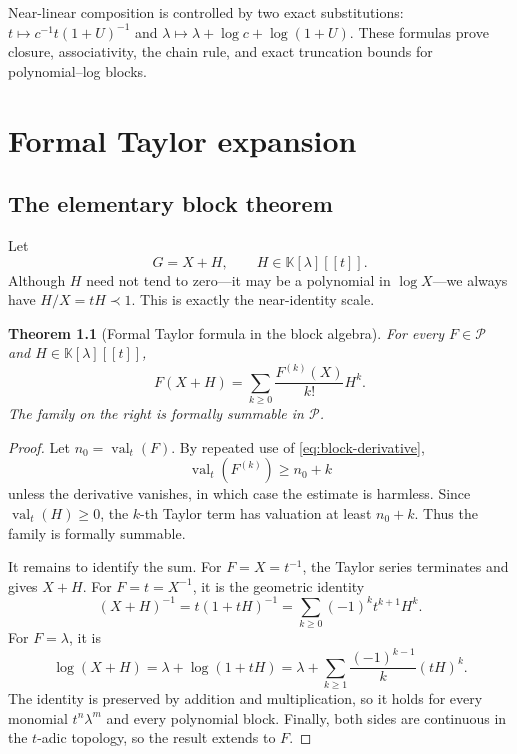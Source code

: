\documentclass[11pt,openany]{book}
\theoremstyle{definition}
\theoremstyle{plain}
\newtheorem{theorem}{Theorem}[chapter]
\theoremstyle{remark}
\newcommand{\K}{\mathbb{K}}
\newcommand{\Plog}{\mathscr{P}}
\newcommand{\precdom}{\prec}
\DeclareMathOperator{\val}{val}
\begin{document}
\begin{summarybox}
Near-linear composition is controlled by two exact substitutions: \(t\mapsto c^{-1}t(1+U)^{-1}\) and \(\lambda\mapsto\lambda+\log c+\log(1+U)\). These formulas prove closure, associativity, the chain rule, and exact truncation bounds for polynomial--log blocks.
\end{summarybox}

\chapter{Formal Taylor expansion}\label{ch:taylor}

\section{The elementary block theorem}
Let
\begin{equation}\label{eq:G-XH}
 G=X+H,
 \qquad H\in\K[\lambda][[t]].
\end{equation}
Although \(H\) need not tend to zero---it may be a polynomial in \(\log X\)---we always have \(H/X=tH\precdom1\). This is exactly the near-identity scale.

\begin{theorem}[Formal Taylor formula in the block algebra]\label{thm:block-taylor}
For every \(F\in\Plog\) and \(H\in\K[\lambda][[t]]\),
\begin{equation}\label{eq:block-taylor}
 F(X+H)=\sum_{k\ge0}\frac{F^{(k)}(X)}{k!}H^k.
\end{equation}
The family on the right is formally summable in \(\Plog\).
\end{theorem}

\begin{proof}
Let \(n_0=\val_t(F)\). By repeated use of \cref{eq:block-derivative},
\[
 \val_t(F^{(k)})\ge n_0+k
\]
unless the derivative vanishes, in which case the estimate is harmless. Since \(\val_t(H)\ge0\), the \(k\)-th Taylor term has valuation at least \(n_0+k\). Thus the family is formally summable.

It remains to identify the sum. For \(F=X=t^{-1}\), the Taylor series terminates and gives \(X+H\). For \(F=t=X^{-1}\), it is the geometric identity
\[
 (X+H)^{-1}=t(1+tH)^{-1}
 =\sum_{k\ge0}(-1)^kt^{k+1}H^k.
\]
For \(F=\lambda\), it is
\[
 \log(X+H)=\lambda+\log(1+tH)
 =\lambda+\sum_{k\ge1}\frac{(-1)^{k-1}}k(tH)^k.
\]
The identity is preserved by addition and multiplication, so it holds for every monomial \(t^n\lambda^m\) and every polynomial block. Finally, both sides are continuous in the \(t\)-adic topology, so the result extends to \(F\).
\end{proof}
\end{document}
